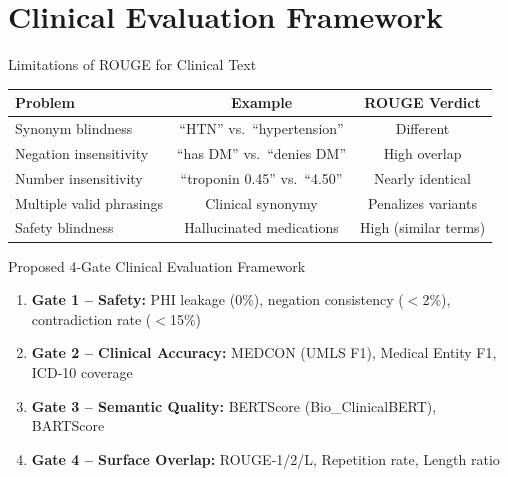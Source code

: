 \documentclass[10pt, aspectratio=169]{beamer}
\begin{document}
\section{Clinical Evaluation Framework}

\begin{frame}{Limitations of ROUGE for Clinical Text}
  \small
  \begin{table}
    \centering
    \small
    \renewcommand{\arraystretch}{1.2}
    \begin{tabular}{lcc}
      \toprule
      \textbf{Problem} & \textbf{Example} & \textbf{ROUGE Verdict} \\
      \midrule
      Synonym blindness & ``HTN'' vs.\ ``hypertension'' & Different \\
      Negation insensitivity & ``has DM'' vs.\ ``denies DM'' & High overlap \\
      Number insensitivity & ``troponin 0.45'' vs.\ ``4.50'' & Nearly identical \\
      Multiple valid phrasings & Clinical synonymy & Penalizes variants \\
      Safety blindness & Hallucinated medications & High (similar terms) \\
      \bottomrule
    \end{tabular}
  \end{table}

  \vspace{0.1cm}

  \begin{block}{Proposed 4-Gate Clinical Evaluation Framework}
    \small
    \begin{enumerate}\setlength{\itemsep}{0pt}
      \item \textbf{Gate 1 -- Safety:} PHI leakage (0\%), negation consistency ($<$2\%), contradiction rate ($<$15\%)
      \item \textbf{Gate 2 -- Clinical Accuracy:} MEDCON (UMLS F1), Medical Entity F1, ICD-10 coverage
      \item \textbf{Gate 3 -- Semantic Quality:} BERTScore (Bio\_ClinicalBERT), BARTScore
      \item \textbf{Gate 4 -- Surface Overlap:} ROUGE-1/2/L, Repetition rate, Length ratio
    \end{enumerate}
  \end{block}
\end{frame}
\end{document}
